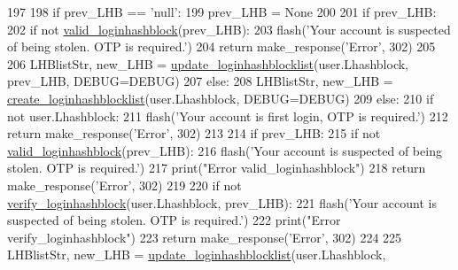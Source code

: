 \begin{DoxyCode}
197 
198             \textcolor{keywordflow}{if} prev\_LHB == \textcolor{stringliteral}{'null'}:
199                 prev\_LHB = \textcolor{keywordtype}{None}
200 
201             \textcolor{keywordflow}{if} prev\_LHB:
202                 \textcolor{keywordflow}{if} \textcolor{keywordflow}{not} \hyperlink{namespaceloginhashblock_adb424539d851426da7b65d53c5a6d577}{valid\_loginhashblock}(prev\_LHB):
203                     flash(\textcolor{stringliteral}{'Your account is suspected of being stolen. OTP is required.'})
204                     \textcolor{keywordflow}{return} make\_response(\textcolor{stringliteral}{'Error'}, 302)
205 
206                 LHBlistStr, new\_LHB = \hyperlink{namespaceloginhashblock_a2bcc7ddd0fcc3788572dd77808cb624d}{update\_loginhashblocklist}(user.Lhashblock, 
      prev\_LHB, DEBUG=DEBUG)
207             \textcolor{keywordflow}{else}:
208                 LHBlistStr, new\_LHB = \hyperlink{namespaceloginhashblock_a550707107141dfb228ca4294d7ea31b4}{create\_loginhashblocklist}(user.Lhashblock, 
      DEBUG=DEBUG)
209         \textcolor{keywordflow}{else}:
210             \textcolor{keywordflow}{if} \textcolor{keywordflow}{not} user.Lhashblock:
211                 flash(\textcolor{stringliteral}{'Your account is first login, OTP is required.'})
212                 \textcolor{keywordflow}{return} make\_response(\textcolor{stringliteral}{'Error'}, 302)
213 
214             \textcolor{keywordflow}{if} prev\_LHB:
215                 \textcolor{keywordflow}{if} \textcolor{keywordflow}{not} \hyperlink{namespaceloginhashblock_adb424539d851426da7b65d53c5a6d577}{valid\_loginhashblock}(prev\_LHB):
216                     flash(\textcolor{stringliteral}{'Your account is suspected of being stolen. OTP is required.'})
217                     print(\textcolor{stringliteral}{"Error valid\_loginhashblock"})
218                     \textcolor{keywordflow}{return} make\_response(\textcolor{stringliteral}{'Error'}, 302)
219 
220                 \textcolor{keywordflow}{if} \textcolor{keywordflow}{not} \hyperlink{namespaceloginhashblock_aa5bb94484a68d0bbebce23b4cfeeb4b7}{verify\_loginhashblock}(user.Lhashblock, prev\_LHB):
221                     flash(\textcolor{stringliteral}{'Your account is suspected of being stolen. OTP is required.'})
222                     print(\textcolor{stringliteral}{"Error verify\_loginhashblock"})
223                     \textcolor{keywordflow}{return} make\_response(\textcolor{stringliteral}{'Error'}, 302)
224 
225                 LHBlistStr, new\_LHB = \hyperlink{namespaceloginhashblock_a2bcc7ddd0fcc3788572dd77808cb624d}{update\_loginhashblocklist}(user.Lhashblock, 

\end{DoxyCode}
